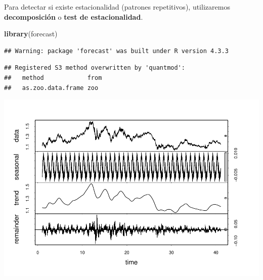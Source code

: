 \documentclass[
]{book}
\newenvironment{Shaded}{\begin{snugshade}}{\end{snugshade}}
\newcommand{\AttributeTok}[1]{\textcolor[rgb]{0.13,0.29,0.53}{#1}}
\newcommand{\CommentTok}[1]{\textcolor[rgb]{0.56,0.35,0.01}{\textit{#1}}}
\newcommand{\DecValTok}[1]{\textcolor[rgb]{0.00,0.00,0.81}{#1}}
\newcommand{\FunctionTok}[1]{\textcolor[rgb]{0.13,0.29,0.53}{\textbf{#1}}}
\newcommand{\NormalTok}[1]{#1}
\newcommand{\OtherTok}[1]{\textcolor[rgb]{0.56,0.35,0.01}{#1}}
\newcommand{\SpecialCharTok}[1]{\textcolor[rgb]{0.81,0.36,0.00}{\textbf{#1}}}
\newcommand{\StringTok}[1]{\textcolor[rgb]{0.31,0.60,0.02}{#1}}
\begin{document}
Para detectar si existe estacionalidad (patrones repetitivos), utilizaremos \textbf{decomposición} o \textbf{test de estacionalidad}.

\begin{Shaded}
\begin{Highlighting}[]
\FunctionTok{library}\NormalTok{(forecast)}
\end{Highlighting}
\end{Shaded}

\begin{verbatim}
## Warning: package 'forecast' was built under R version 4.3.3
\end{verbatim}

\begin{verbatim}
## Registered S3 method overwritten by 'quantmod':
##   method            from
##   as.zoo.data.frame zoo
\end{verbatim}

\begin{Shaded}
\end{Shaded}

\includegraphics{bookdown_time_series_files/figure-latex/unnamed-chunk-6-1.pdf}
\end{document}
